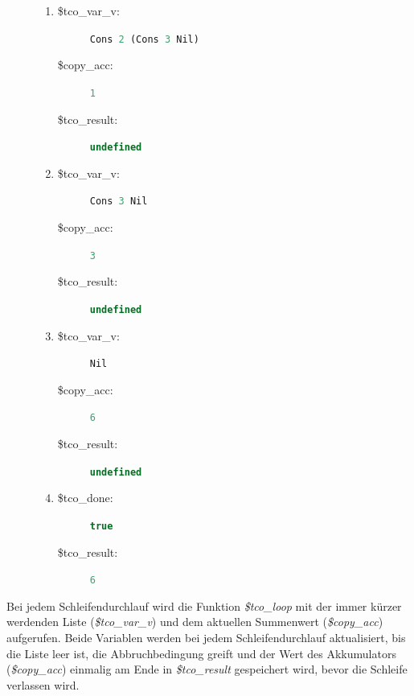\documentclass[
12pt,
ngerman,
oneside]
{scrbook} %
\begin{document}
\begin{figure}
	\vspace{-0.5cm}
	\begin{enumerate}
		\item 
		\begin{description}
			\item[\$tco_var_v:] \lstinline[language=javascript, columns=fixed]{Cons 2 (Cons 3 Nil)}
			\item[\$copy_acc:] \lstinline[language=javascript, columns=fixed]{1}
			\item[\$tco_result:] \lstinline[language=javascript, columns=fixed]{undefined}
		\end{description}
		\item 
		\begin{description}
			\item[\$tco_var_v:] \lstinline[language=javascript, columns=fixed]{Cons 3 Nil}
			\item[\$copy_acc:] \lstinline[language=javascript, columns=fixed]{3}
			\item[\$tco_result:] \lstinline[language=javascript, columns=fixed]{undefined}
		\end{description}
		\item 
		\begin{description}
			\item[\$tco_var_v:] \lstinline[language=javascript, columns=fixed]{Nil}
			\item[\$copy_acc:] \lstinline[language=javascript, columns=fixed]{6}
			\item[\$tco_result:] \lstinline[language=javascript, columns=fixed]{undefined}
		\end{description}
		\item
		\begin{description}
			\item[\$tco_done:] \lstinline[language=javascript, columns=fixed]{true}
			\item[\$tco_result:] \lstinline[language=javascript, columns=fixed]{6}
		\end{description}
	\end{enumerate}
\end{figure}

Bei jedem Schleifendurchlauf wird die Funktion \emph{\$tco_loop} mit der immer kürzer werdenden Liste (\emph{\$tco_var_v}) und dem aktuellen Summenwert (\emph{\$copy_acc}) aufgerufen. Beide Variablen werden bei jedem Schleifendurchlauf aktualisiert, bis die Liste leer ist, die Abbruchbedingung greift und der Wert des Akkumulators (\emph{\$copy_acc}) einmalig am Ende in \emph{\$tco_result} gespeichert wird, bevor die Schleife verlassen wird. 
\end{document}
